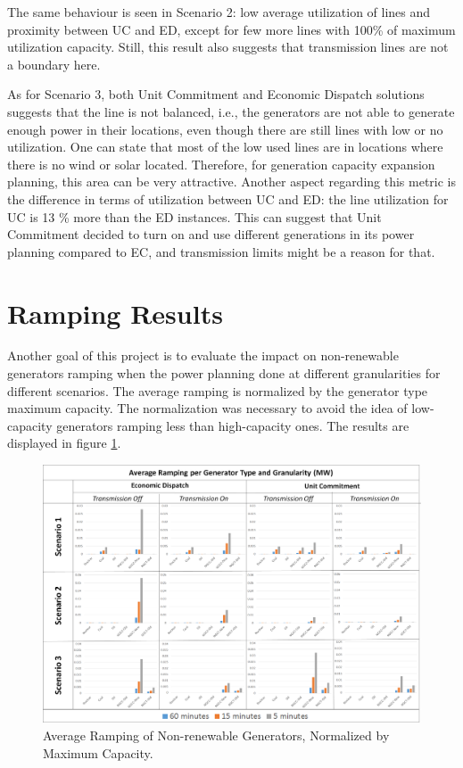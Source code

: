 \documentclass[12pt,LUDisStyle,twosided]{book}
\begin{document}
The same behaviour is seen in Scenario 2: low average utilization of lines and proximity between UC and ED, except for few more lines with 100\% of maximum utilization capacity. Still, this result also suggests that transmission lines are not a boundary here.

As for Scenario 3, both Unit Commitment and Economic Dispatch solutions suggests that the line is not balanced, i.e., the generators are not able to generate enough power in their locations, even though there are still lines with low or no utilization. One can state that most of the low used lines are in locations where there is no wind or solar located. Therefore, for generation capacity expansion planning, this area can be very attractive. Another aspect regarding this metric is the difference in terms of utilization between UC and ED: the line utilization for UC is 13 \% more than the ED instances. This can suggest that Unit Commitment decided to turn on and use different generations in its power planning compared to EC, and transmission limits might be a reason for that.

\section{Ramping Results} \label{section:ramping}

Another goal of this project is to evaluate the impact on non-renewable generators ramping when the power planning done at different granularities for different scenarios. The average ramping is normalized by the generator type maximum capacity. The normalization was necessary to avoid the idea of low-capacity generators ramping less than high-capacity ones. The results are displayed in figure  \ref{fig:averageramping}.

\begin{figure}[H] 
  \centering
  
	  \includegraphics[width=\textwidth,height=\textheight,keepaspectratio]{averageRamping.png}
  
  \caption{Average Ramping of Non-renewable Generators, Normalized by Maximum Capacity.}
  \label{fig:averageramping}
    
\end{figure}
\end{document}
